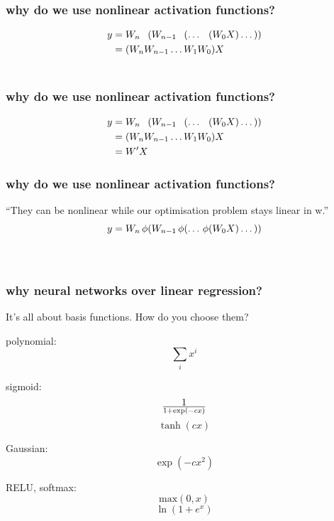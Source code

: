 \documentclass[USenglish,pdftex,compress,10pt,svgnamesi,handout]{beamer}
\begin{document}
\begin{frame}
    \frametitle{why do we use nonlinear activation functions?}
    
    \begin{align}
        y &= W_n \,\textcolor{white}{\phi}( W_{n-1} \,\textcolor{white}{\phi} (\dots \,\textcolor{white}{\phi}(W_0 X) \dots)\nonumber)\\
              &= (W_n W_{n-1} \dots W_1 W_0) X\nonumber\\
          &\textcolor{white}{= W'X}\nonumber
    \end{align}
\end{frame}

\begin{frame}
    \frametitle{why do we use nonlinear activation functions?}
    
    \begin{align}
        y &= W_n \,\textcolor{white}{\phi}( W_{n-1} \,\textcolor{white}{\phi} (\dots \,\textcolor{white}{\phi}(W_0 X) \dots)\nonumber)\\
              &= (W_n W_{n-1} \dots W_1 W_0) X\nonumber\\
                        &= W'X\nonumber
    \end{align}
\end{frame}

\begin{frame}
    \frametitle{why do we use nonlinear activation functions?}

``They can be nonlinear while our optimisation problem stays linear in w.''\\
    \begin{align}
    y &= W_n \,\phi( W_{n-1} \,\phi (\dots \,\phi(W_0 X) \dots))\nonumber \\
          &\textcolor{white}{= W_n W_{n-1} \dots W_1 W_0 X}\nonumber\\
                    &\textcolor{white}{= W'X}\nonumber
    \end{align}

\end{frame}



\begin{frame}
    \frametitle{why neural networks over linear regression?}
    It's all about basis functions.  How do you choose them?  
    
    polynomial: $$\sum_i x^i$$
    
    sigmoid: $$1 \over 1 + \exp(-c x)$$
    	$$\tanh(cx)$$
    
    Gaussian: $$\exp(-c x^2)$$
    
    RELU, softmax: $$\mathrm{max}(0,x)$$  $$\ln(1+e^x)$$
\end{frame}
 
\end{document}
